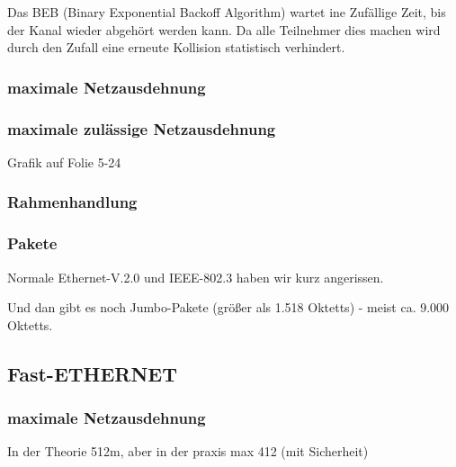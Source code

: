 \documentclass[a4paper]{article}
\begin{document}
Das BEB (Binary Exponential Backoff Algorithm) wartet ine Zufällige Zeit, bis der Kanal wieder abgehört werden kann. Da alle Teilnehmer dies machen wird durch den Zufall eine erneute Kollision statistisch verhindert.

\subsubsection{maximale Netzausdehnung}


\subsubsection{maximale zulässige Netzausdehnung}

Grafik auf Folie 5-24

\subsubsection{Rahmenhandlung}


\subsubsection{Pakete}

Normale Ethernet-V.2.0 und IEEE-802.3 haben wir kurz angerissen.

Und dan gibt es noch Jumbo-Pakete (größer als 1.518 Oktetts) - meist ca. 9.000 Oktetts.

\subsection{Fast-ETHERNET}

\subsubsection{maximale Netzausdehnung}

In der Theorie 512m, aber in der praxis max 412 (mit Sicherheit)
\end{document}
